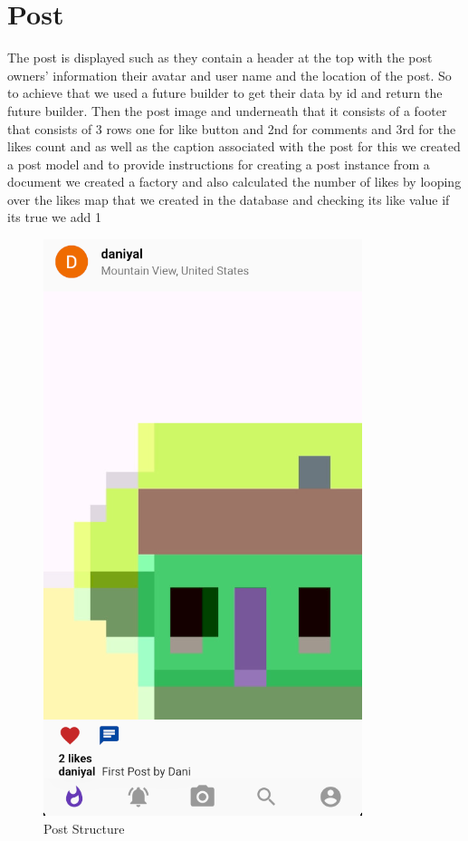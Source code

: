 \section{Post}
The post is displayed such as they contain a header at the top with the post owners' information their avatar and user name and the location of the post. So to achieve that we used a future builder to get their data by id and return the future builder. Then the post image and underneath that it consists of a footer that consists of 3 rows one for like button and 2nd for comments and 3rd for the likes count and as well as the caption associated with the post for this we created a post model and to provide instructions for creating a post instance from a document we created a factory and also calculated the number of likes by looping over the likes map that we created in the database and checking its like value if its true we add 1

\begin{figure}[!htb]
    \centering
    \includegraphics[scale=0.70]{AppScreenShots/Posts Structure.PNG}
    \caption{Post Structure}
    \label{fig:Post Structure}
\end{figure}

